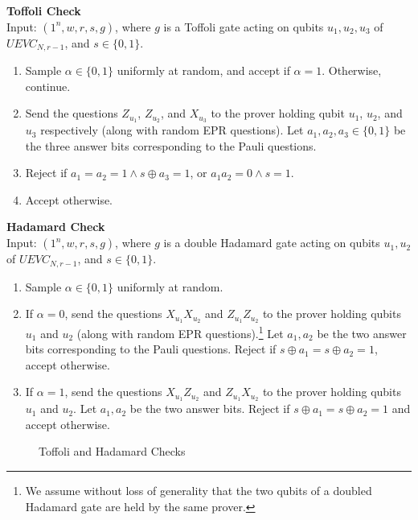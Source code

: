 \vspace{10pt}
\begin{center}
\begin{mdframed}
    \textbf{Toffoli Check} \\
	Input: $(1^n,w,r,s,g)$, where $g$ is a Toffoli gate acting on qubits $u_1,u_2,u_3$ of $UEVC_{N,r-1}$, and $s \in \{0,1\}$. 
	\begin{enumerate}
		\item Sample $\alpha \in \{0,1\}$ uniformly at random, and accept if $\alpha = 1$. Otherwise, continue.
		\item Send the questions $Z_{u_1}$, $Z_{u_2}$, and $X_{u_3}$ to the prover holding qubit $u_1$, $u_2$, and $u_3$ respectively (along with random EPR questions). Let $a_1,a_2,a_3 \in \{0,1\}$ be the three answer bits corresponding to the Pauli questions. 
		\item Reject if $a_1 = a_2 = 1 \wedge s \oplus a_3 = 1$, or $a_1 a_2 = 0 \wedge s = 1$.
		\item Accept otherwise.
	\end{enumerate}    
    \vspace{10pt}
\textbf{Hadamard Check} \\
	Input: $(1^n,w,r,s,g)$, where $g$ is a double Hadamard gate acting on qubits $u_1,u_2$ of $UEVC_{N,r-1}$, and $s \in \{0,1\}$.

	\begin{enumerate}
		\item Sample $\alpha \in \{0,1\}$ uniformly at random.
		\item If $\alpha = 0$, send the questions  $X_{u_1} X_{u_2}$ and $Z_{u_1} Z_{u_2}$ to the prover holding qubits $u_1$ and $u_2$ (along with random EPR questions).\footnote{We assume without loss of generality that the two qubits of a doubled Hadamard gate are held by the same prover.} Let $a_1,a_2$ be the two answer bits corresponding to the Pauli questions. Reject if $s \oplus a_1 = s \oplus a_2 = 1$, accept otherwise.
		\item If $\alpha = 1$, send the questions $X_{u_1} Z_{u_2}$ and $Z_{u_1} X_{u_2}$ to the prover holding qubits $u_1$ and $u_2$. Let $a_1,a_2$ be the two answer bits. Reject if $s \oplus a_1 = s \oplus a_2 = 1$ and accept otherwise.
	\end{enumerate}    
\end{mdframed}

\end{center}
\begin{figure}[H]
\caption{Toffoli and Hadamard Checks}
\label{fig:toffoli_hadamard_check}
\end{figure}

